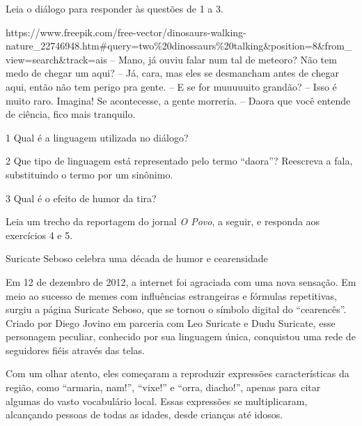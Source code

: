 Leia o diálogo para responder às questões de 1 a 3.

https://www.freepik.com/free-vector/dinosaurs-walking-nature\_22746948.htm\#query=two\%20dinossaurs\%20talking\&position=8\&from\_view=search\&track=ais
-- Mano, já ouviu falar num tal de meteoro? Não tem medo de chegar um
aqui? -- Já, cara, mas eles se desmancham antes de chegar aqui, então
não tem perigo pra gente. -- E se for muuuuuito grandão? -- Isso é muito
raro. Imagina! Se acontecesse, a gente morreria. -- Daora que você
entende de ciência, fico mais tranquilo.

\num{1} Qual é a linguagem utilizada no diálogo?



\num{2} Que tipo de linguagem está representado pelo termo ``daora''?
Reescreva a fala, substituindo o termo por um sinônimo.



\num{3} Qual é o efeito de humor da tira?



Leia um trecho da reportagem do jornal \emph{O Povo}, a seguir, e
responda aos exercícios 4 e 5.

Suricate Seboso celebra uma década de humor e cearensidade

Em 12 de dezembro de 2012, a internet foi agraciada com uma nova
sensação. Em meio ao sucesso de memes com influências estrangeiras e
fórmulas repetitivas, surgiu a página Suricate Seboso, que se tornou o
símbolo digital do ``cearencês''. Criado por Diego Jovino em parceria
com Leo Suricate e Dudu Suricate, esse personagem peculiar, conhecido
por sua linguagem única, conquistou uma rede de seguidores fiéis através
das telas.

Com um olhar atento, eles começaram a reproduzir expressões
características da região, como ``armaria, nam!'', ``vixe!'' e ``orra,
diacho!'', apenas para citar algumas do vasto vocabulário local. Essas
expressões se multiplicaram, alcançando pessoas de todas as idades,
desde crianças até idosos.

